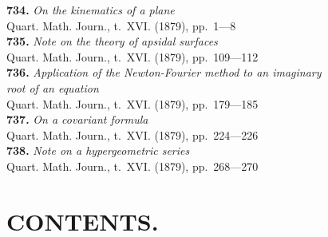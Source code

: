 \documentclass[12pt,a4paper,oneside]{book}
\theoremstyle{plain}
\theoremstyle{definition}
\theoremstyle{remark}
\begin{document}
\textbf{734.} \textit{On the kinematics of a plane} \\
\hspace*{2em}Quart. Math. Journ., t.~XVI. (1879), pp.~1---8\\[0.3em]
\textbf{735.} \textit{Note on the theory of apsidal surfaces} \\
\hspace*{2em}Quart. Math. Journ., t.~XVI. (1879), pp.~109---112\\[0.3em]
\textbf{736.} \textit{Application of the Newton-Fourier method to an imaginary}\\
\hspace*{2em}\textit{root of an equation} \\
\hspace*{2em}Quart. Math. Journ., t.~XVI. (1879), pp.~179---185\\[0.3em]
\textbf{737.} \textit{On a covariant formula} \\
\hspace*{2em}Quart. Math. Journ., t.~XVI. (1879), pp.~224---226\\[0.3em]
\textbf{738.} \textit{Note on a hypergeometric series} \\
\hspace*{2em}Quart. Math. Journ., t.~XVI. (1879), pp.~268---270

\cleardoublepage

\chapter*{CONTENTS.}
\end{document}
